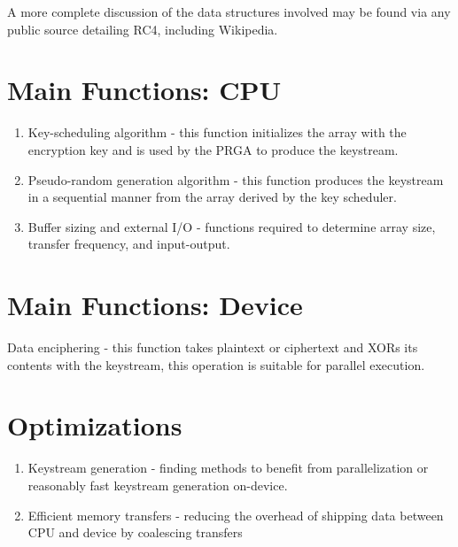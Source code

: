 \documentclass{article}
\begin{document}
  A more complete discussion of the data structures involved may be found via any public source detailing RC4, including Wikipedia.
  
  \section{Main Functions: CPU}
  
  \begin{enumerate}
    \item Key-scheduling algorithm - this function initializes the array with the encryption key and is used by the PRGA to produce the keystream.
    \item Pseudo-random generation algorithm - this function produces the keystream in a sequential manner from the array derived by the key scheduler.
    \item Buffer sizing and external I/O - functions required to determine array size, transfer frequency, and input-output.
  \end{enumerate}


  \section{Main Functions: Device}
 Data enciphering - this function takes plaintext or ciphertext and XORs its contents with the keystream, this operation is suitable for parallel execution.

  \section{Optimizations}
  \begin{enumerate}
    \item Keystream generation - finding methods to benefit from parallelization or reasonably fast keystream generation on-device.
    \item Efficient memory transfers - reducing the overhead of shipping data between CPU and device by coalescing transfers
  \end{enumerate}

  
\end{document}
